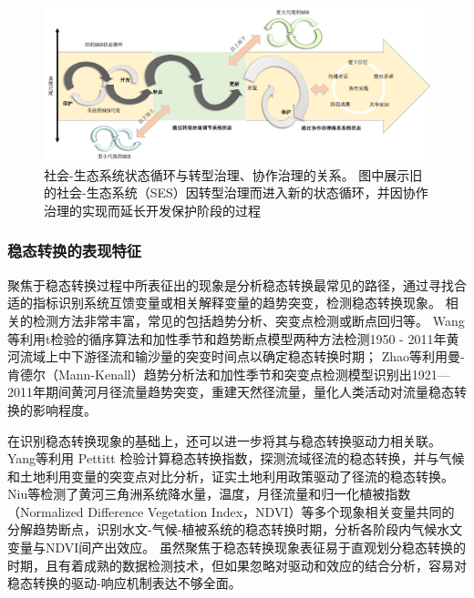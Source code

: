 \begin{figure}[!ht] %
    \includegraphics[width=\textwidth]{img/ch1/ch1_governance_driver.png}
    \caption[社会-生态系统状态循环]{社会-生态系统状态循环与转型治理、协作治理的关系。
    图中展示旧的社会-生态系统（SES）因转型治理而进入新的状态循环，并因协作治理的实现而延长开发保护阶段的过程}\label{ch1:fig:governance_driver}
\end{figure}

\subsubsection{稳态转换的表现特征}

聚焦于稳态转换过程中所表征出的现象是分析稳态转换最常见的路径，通过寻找合适的指标识别系统互馈变量或相关解释变量的趋势突变，检测稳态转换现象。
相关的检测方法非常丰富，常见的包括趋势分析、突变点检测或断点回归等。
Wang等利用t检验的循序算法和加性季节和趋势断点模型两种方法检测1950 - 2011年黄河流域上中下游径流和输沙量的突变时间点以确定稳态转换时期\cite{wang2014}；
Zhao等利用曼-肯德尔（Mann-Kenall）趋势分析法和加性季节和突变点检测模型识别出1921—2011年期间黄河月径流量趋势突变，重建天然径流量，量化人类活动对流量稳态转换的影响程度\cite{zhao2015}。

在识别稳态转换现象的基础上，还可以进一步将其与稳态转换驱动力相关联。
Yang等利用 Pettitt 检验计算稳态转换指数，探测流域径流的稳态转换，并与气候和土地利用变量的突变点对比分析，证实土地利用政策驱动了径流的稳态转换\cite{yang2012a}。
Niu等检测了黄河三角洲系统降水量，温度，月径流量和归一化植被指数（Normalized Difference Vegetation Index，NDVI）等多个现象相关变量共同的分解趋势断点，识别水文-气候-植被系统的稳态转换时期，分析各阶段内气候水文变量与NDVI间产出效应\cite{niu2020}。
虽然聚焦于稳态转换现象表征易于直观划分稳态转换的时期，且有着成熟的数据检测技术，但如果忽略对驱动和效应的结合分析，容易对稳态转换的驱动-响应机制表达不够全面。

